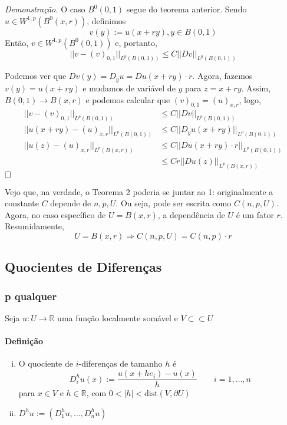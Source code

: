 \documentclass[a4paper, 11pt]{book}
\newcommand{\qed}{$\hfill\square$}
\newcommand{\R}{\mathbb{R}}
\newcommand{\pu}{\partial U}
\begin{document}
\textit{Demonstração.} O caso $B^0(0,1)$ segue do teorema anterior. Sendo $u  \in W^{1,p}(B^0(x,r))$, definimos \[v(y):=u(x+ry), y \in B(0,1)\] Então, $v \in W^{1,p}(B^0(0,1))$ e, portanto, \[ || v - (v)_{0,1}||_{L^p(B(0,1))} \leq C ||Dv||_{L^p(B(0,1))}\]

Podemos ver que $Dv(y) = D_yu = Du(x+ry)\cdot r$. Agora, fazemos $v(y)=u(x+ry)$ e mudamos de variável de $y$ para $z=x+ry$. Assim, $B(0,1) \rightarrow B(x,r)$ e podemos calcular que $(v)_{0,1}=(u)_{x,r}$, logo,
\begin{align*}
	|| v - (v)_{0,1}||_{L^p(B(0,1))} &\leq C ||Dv||_{L^p(B(0,1))} \\
	|| u(x+ry) - (u)_{x,r}||_{L^p(B(0,1))} &\leq C ||D_y u(x+ry)||_{L^p(B(0,1))} \\
	|| u(z) - (u)_{x,r}||_{L^p(B(x,r))} &\leq C ||Du(x+ry)\cdot r||_{L^p(B(0,1))} \\
	&\leq C r ||Du(z)||_{L^p(B(x,r))}
\end{align*}\qed

Vejo que, na verdade, o Teorema 2 poderia se juntar ao 1: originalmente a constante $C$ depende de $n,p,U$. Ou seja, pode ser escrita como $C(n,p,U)$. Agora, no caso específico de $U=B(x,r)$, a dependência de $U$ é um fator $r$. Resumidamente, \[U = B(x,r) \Rightarrow C(n,p,U) = C(n,p)\cdot r\]







\subsection{Quocientes de Diferenças}

\subsubsection{p qualquer}

Seja $u:U\rightarrow \R$ uma função localmente somável e $V\subset\subset U$

\paragraph{Definição}
\begin{enumerate}[(i)]
	\item O quociente de $i$-diferenças de tamanho $h$ é \[
		D_i^h u(x) := \frac{u(x+he_i)-u(x)}{h}\qquad i=1,\ldots,n\]
	para $x \in V$ e $h \in \R$, com $0<|h|<\text{dist}(V, \pu)$
	\item $D^h u := (D_1^hu, \ldots, D_n^h u)$
\end{enumerate}
\end{document}
